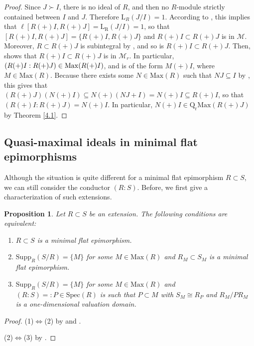 \documentclass[12pt,leqno]{amsart}
\newtheorem{proposition}[theorem]{Proposition}
\theoremstyle{definition}
\begin{document}
\begin{proof} Since $J\succ I$, there is no ideal of $R$, and then no $R$-module strictly contained between $I$ and $J$. Therefore $\mathrm{L}_R (J/I)=1$. According to \cite[Proposition 2.8]{Pic 8}, this implies that $\ell[R (+)I,R(+)J]=\mathrm{L_R}(J/I)=1$, so that $[R(+)I,R(+)J]=\{R(+)I,R(+)J\}$ and $R(+)I\subset R(+)J$ is in $\mathcal M$. Moreover, $R\subset R(+)J$ is subintegral by \cite[Lemma 2.1]{Pic 8}, and so is $R(+)I\subset R(+)J$. Then, \cite[Lemma 3.1]{Pic 4} shows that $R(+)I\subset R(+)J$ is in $\mathcal M_r$. In particular, $(R(+)I:R(+)J)\in\mathrm{Max}(R(+)\\I)$, and is of the form $M(+)I$, where $M\in\mathrm{Max}(R)$. Because there exists some $N\in\mathrm{Max}(R)$ such that $NJ\subseteq I$ by \cite[Corollary 1, p.237]{ZS}, this gives that $(R(+)J)(N(+)I)\subseteq N(+)(NJ+I)=N(+)I\subseteq R(+)I$, so that $(R(+)I:R(+)J)=N(+)I$. In particular, $N(+)I\in\mathrm{Q_rMax}(R(+)J)$ by Theorem \ref{4.1}. 
\end{proof}

\subsection{Quasi-maximal ideals in minimal flat epimorphisms}

Although the situation is quite different for a minimal flat epimorphism 
 $R\subset S$, we can still consider the conductor $(R:S)$. Before, we first give a characterization of such extensions. 

\begin{proposition}\label{4.31} Let $R\subset S$ be an extension. The following conditions are equivalent:
\begin{enumerate}
\item $R\subset S$ is a minimal flat epimorphism.
\item $\mathrm{Supp}_R(S/R)=\{M\}$ for some $M\in\mathrm{Max}(R)$ and $R_M\subset S_M$ is a  minimal flat epimorphism.
\item $\mathrm{Supp}_R(S/R)=\{M\}$ for some $M\in\mathrm{Max}(R)$ and $(R:S)=:P\in\mathrm{Spec}(R)$ is such that $P\subset M$ with $S_M\cong R_P$ and $R_M/PR_M$ is a one-dimensional valuation domain.
\end{enumerate} 
\end{proposition}
\begin{proof} (1)$\Leftrightarrow$(2) by \cite[Proposition 4.6]{DPPS} and \cite[Th\'eor\`eme 2.2]{FO}.

(2)$\Leftrightarrow$(3) by \cite[Proposition 9.2 and Corollary 9.3]{ARP}.
\end{proof}
\end{document}
